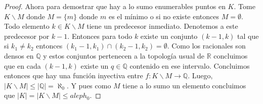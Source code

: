 \documentclass[letter,twoside,12pt]{article}
\begin{document}
\begin{enumerate}
\begin{proof}
		Ahora para demostrar que hay a lo sumo enumerables puntos en $ K $. Tome $ K\backslash M $ donde $ M = \{m\}$ donde $ m $ es el mínimo o si no existe entonces $ M = \emptyset $. Todo elemento $ k \in K\backslash M $ tiene un predecesor inmediato. Denotemos a este predecesor por $ k-1 $. Entonces para todo $ k $ existe un conjunto $ (k-1,k) $ tal que si $ k_1 \not = k_2 $ entonces $ (k_1-1,k_1) \cap (k_2-1,k_2) = \emptyset $. Como los racionales son densos en $ \mathbb{Q} $ y estos conjuntos pertenecen a la topología usual de $ \mathbb{R} $ concluimos que en cada $ (k-1,k) $ existe un $ q \in \mathbb{Q} $ contenido en ese intervalo. Concluimos entonces que hay una función inyectiva entre $f: K\backslash M \to \mathbb{Q} $. Luego, $ |K\backslash M| \leq |\mathbb{Q}|= \aleph_0 $. Y pues como $ M $ tiene a lo sumo un elemento concluimos que $ |K|= |K\backslash M| \leq aleph_0 $.
	\end{proof}
	
\end{enumerate}
\end{document}
